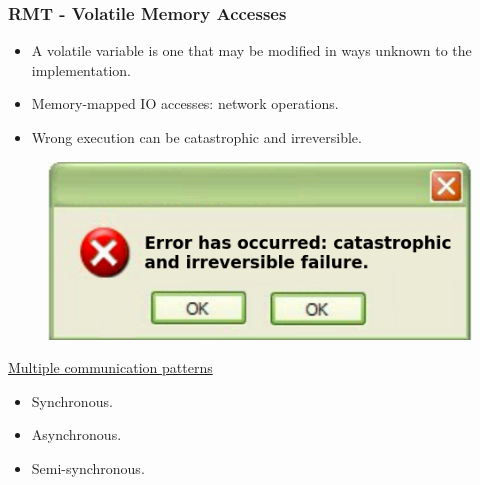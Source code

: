 \documentclass[xcolor=pdftex,dvipsnames,table]{beamer}
\begin{document}
\begin{frame}
	\frametitle{RMT - Volatile Memory Accesses}
    
    \begin{itemize}      		   
   		\item A volatile variable is one that may be modified in ways unknown to the implementation.
        \item Memory-mapped IO accesses: network operations. \pause
        \item Wrong execution can be catastrophic and irreversible. 
    \end{itemize}
		
    \begin{figure}[H]
    	\begin{center} \includegraphics[scale=0.35]{CatastrophicFailure.png} \end{center} 
    \end{figure} \pause
   
     \underline{Multiple communication patterns}
        \begin{itemize}
    		\item Synchronous.
        	\item Asynchronous.
            \item Semi-synchronous.
    	\end{itemize}
    
\end{frame}
\end{document}
